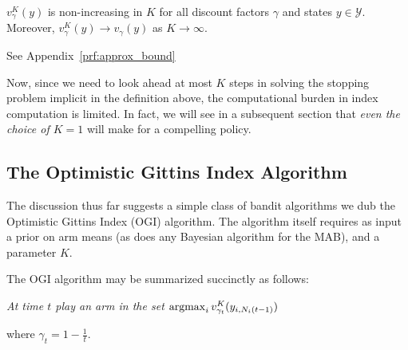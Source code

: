 \begin{lemma} \label{lemma:approx_bound}
$v_\gamma^{K}(y)$ is non-increasing in $K$ for all discount factors $\gamma$ and states $y \in \mathcal Y$.
Moreover, $v^K_\gamma(y) \to v_\gamma(y)$ as $K \to \infty$.	
\end{lemma}
\begin{myproof}[Proof]
	See Appendix~\ref{prf:approx_bound}
\end{myproof}

Now, since we need to look ahead at most $K$ steps in solving the stopping problem implicit in the definition above, the computational burden in index computation is limited. In fact, we will see in a subsequent section that {\em even the choice of $K=1$} will make for a compelling policy. 


\subsection{The Optimistic Gittins Index Algorithm}

The discussion thus far suggests a simple class of bandit algorithms we dub the Optimistic Gittins Index (OGI) algorithm. The algorithm itself requires as input a prior on arm means (as does any Bayesian algorithm for the MAB), and a parameter $K$. 


\noindent The OGI algorithm may be summarized succinctly as follows:

\begin{center}
{\em At time $t$ play an arm in the set $\operatorname*{\mathrm{argmax}}_i v^K_{\gamma_t}(y_{i,N_i(t-1)})$}
\end{center}

\noindent where $\gamma_t = 1 - \frac{1}{t}$. 


